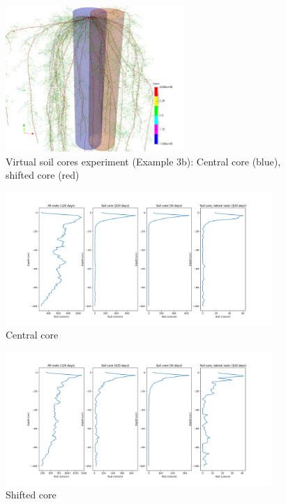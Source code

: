 \documentclass[a4paper]{article}
\begin{document}
\begin{figure}
\centering
\includegraphics[width=0.6\textwidth]{example_3b.png}
\caption{Virtual soil cores experiment (Example 3b): Central core (blue), shifted core (red)} \label{fig:soilcoreGeom}
\end{figure} 

\begin{figure}
\centering
\includegraphics[width=0.9\textwidth]{example_3b1.png} 
\caption{Central core} \label{fig:central}
\end{figure}

\begin{figure}
\centering
\includegraphics[width=0.9\textwidth]{example_3b2.png} 
\caption{Shifted core} \label{fig:shifted}
\end{figure}
\end{document}
